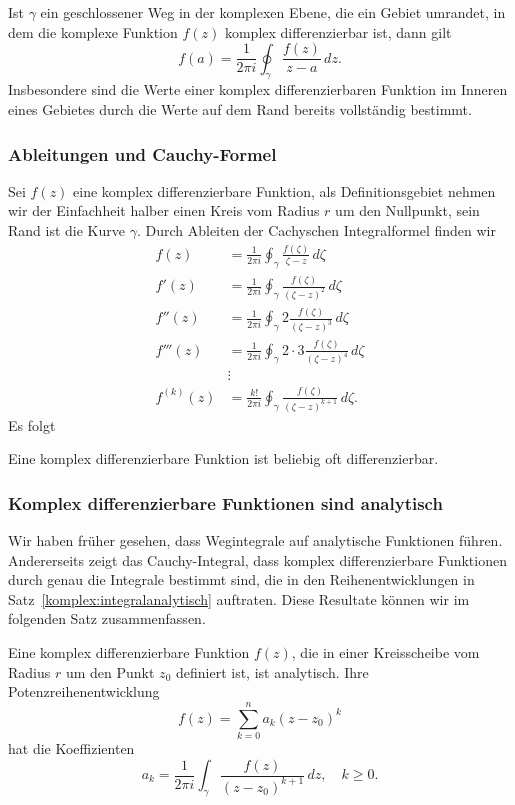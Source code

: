 \begin{satz}[Cauchy]
Ist $\gamma$ ein geschlossener Weg in der komplexen Ebene, die ein
Gebiet umrandet, in dem die komplexe Funktion $f(z)$ komplex
differenzierbar ist, dann gilt
\[
f(a)=\frac{1}{2\pi i}\oint_{\gamma}\frac{f(z)}{z-a}\,dz.
\]
Insbesondere sind die Werte einer komplex differenzierbaren Funktion
im Inneren eines Gebietes durch die Werte auf dem Rand bereits vollständig
bestimmt.
\end{satz}

\subsubsection{Ableitungen und Cauchy-Formel}
Sei $f(z)$ eine komplex differenzierbare Funktion, als Definitionsgebiet
nehmen wir der Einfachheit halber einen Kreis vom Radius $r$ um den Nullpunkt,
sein Rand ist die Kurve $\gamma$.
Durch Ableiten der Cachyschen Integralformel finden wir
\begin{align*}
f(z)
&=
\frac1{2\pi i}\oint_{\gamma}\frac{f(\zeta)}{\zeta-z}\,d\zeta
\\
f'(z)
&=
\frac1{2\pi i}\oint_{\gamma}\frac{f(\zeta)}{(\zeta-z)^2}\,d\zeta
\\
f'' (z)
&=
\frac1{2\pi i}\oint_{\gamma}2\frac{f(\zeta)}{(\zeta-z)^3}\,d\zeta
\\
f'''(z)
&=
\frac1{2\pi i}\oint_{\gamma}2\cdot 3\frac{f(\zeta)}{(\zeta-z)^4}\,d\zeta
\\
&\vdots
\\
f^{(k)}(z)
&=
\frac{k!}{2\pi i}\oint_{\gamma}\frac{f(\zeta)}{(\zeta-z)^{k+1}}\,d\zeta.
\end{align*}
Es folgt

\begin{satz}
Eine komplex differenzierbare Funktion ist beliebig oft differenzierbar.
\end{satz}

\subsubsection{Komplex differenzierbare Funktionen sind analytisch}
Wir haben früher gesehen, dass Wegintegrale auf analytische Funktionen
führen.
Andererseits zeigt das Cauchy-Integral, dass komplex differenzierbare
Funktionen durch genau die Integrale bestimmt sind, die in den
Reihenentwicklungen in Satz~\ref{komplex:integralanalytisch} auftraten.
Diese Resultate können wir im folgenden Satz zusammenfassen.

\begin{satz}
Eine komplex differenzierbare Funktion $f(z)$, die in einer Kreisscheibe
vom Radius $r$ um den Punkt $z_0$ definiert ist, ist analytisch.
Ihre Potenzreihenentwicklung
\[
f(z)=\sum_{k=0}^na_k(z-z_0)^k
\]
hat die Koeffizienten
\[
a_k=\frac1{2\pi i}\int_{\gamma}\frac{f(z)}{(z-z_0)^{k+1}}\,dz,\quad
k\ge 0.
\]
\end{satz}

